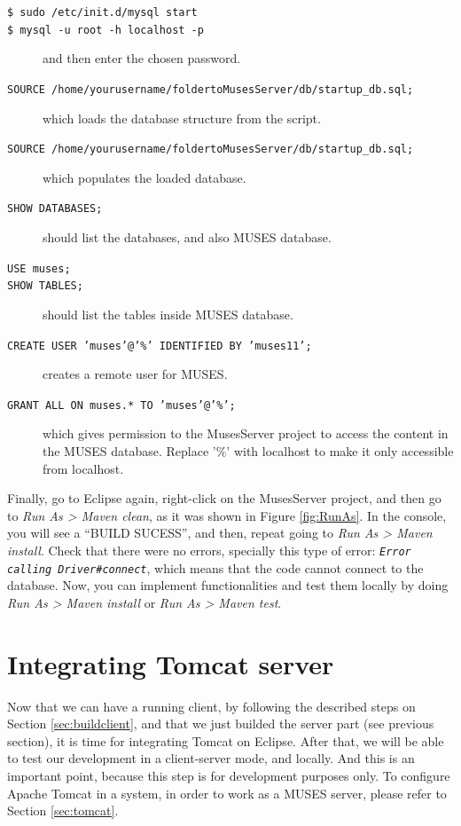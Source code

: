 \documentclass[a4paper,11pt]{book}
\begin{document}
\begin{description}
  \item[\texttt{\$ sudo /etc/init.d/mysql start}] 
  \item[\texttt{\$ mysql -u root -h localhost -p}] and then enter the chosen password.
  \item[\texttt{SOURCE /home/yourusername/foldertoMusesServer/db/startup\_db.sql;}] which loads the database structure from the script.
  \item[\texttt{SOURCE /home/yourusername/foldertoMusesServer/db/startup\_db.sql;}] which populates the loaded database.
  \item[\texttt{SHOW DATABASES;}] should list the databases, and also MUSES database.
  \item[\texttt{USE muses;}]
  \item[\texttt{SHOW TABLES;}] should list the tables inside MUSES database.
  \item[\texttt{CREATE USER 'muses'@'\%' IDENTIFIED BY 'muses11';}] creates a remote user for MUSES.
  \item[\texttt{GRANT ALL ON muses.* TO 'muses'@'\%';}] which gives permission to the MusesServer project to access the content in the MUSES database. Replace '\%' with localhost to make it only accessible from localhost.
\end{description}

Finally, go to Eclipse again, right-click on the MusesServer project, and then go to \textit{Run As > Maven clean}, as it was shown in Figure \ref{fig:RunAs}. In the console, you will see a ``BUILD SUCESS'', and then, repeat going to \textit{Run As > Maven install}. Check that there were no errors, specially this type of error: \texttt{\textit{Error calling Driver\#connect}}, which means that the code cannot connect to the database. Now, you can implement functionalities and test them locally by doing \textit{Run As > Maven install} or \textit{Run As > Maven test}.

\section{Integrating Tomcat server}
\label{sec:eclipsetomcat}

Now that we can have a running client, by following the described steps on Section \ref{sec:buildclient}, and that we just builded the server part (see previous section), it is time for integrating Tomcat on Eclipse. After that, we will be able to test our development in a client-server mode, and locally. And this is an important point, because this step is for development purposes only. To configure Apache Tomcat in a system, in order to work as a MUSES server, please refer to Section \ref{sec:tomcat}.
\end{document}
